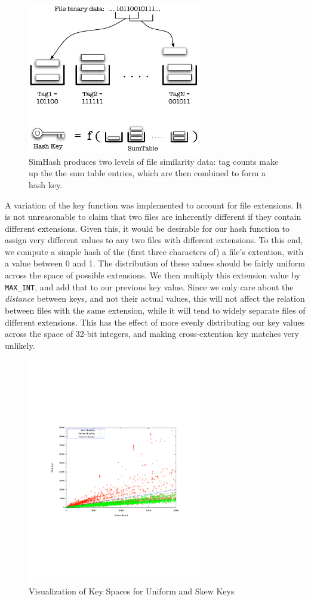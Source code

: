 \documentclass[10pt, twocolumn]{article}
\begin{document}
 \begin{figure}[t] 
 \centering
\includegraphics[width= 3in]{simHashInternals.pdf}
\caption{SimHash produces two levels of file similarity data: tag counts make up the the sum table entries, which are then combined to form a hash key.}
\label{simHash} 
\end{figure}   

A variation of the key function was implemented to account for file extensions.  It is not unreasonable to claim that two files are inherently different if they contain different extensions.  Given this, it would be desirable for our hash function to assign very different values to any two files with different extensions.  To this end, we compute a simple hash of the (first three characters of) a file's extention, with a value between 0 and 1.  The distribution of these values should be fairly uniform across the space of possible extensions.  We then multiply this extension value by {\tt MAX\_INT}, and add that to our previous key value.  Since we only care about the {\it distance} between keys, and not their actual values, this will not affect the relation between files with the same extension, while it will tend to widely separate files of different extensions.  This has the effect of more evenly distributing our key values across the space of 32-bit integers, and making cross-extention key matches very unlikely.

 \begin{figure}[h] 
 \centering
\includegraphics[width= 3in]{scatter_circles.pdf}
\caption{Visualization of Key Spaces for Uniform and Skew Keys}
\label{scatterPoster} 
\end{figure}   
\end{document}
